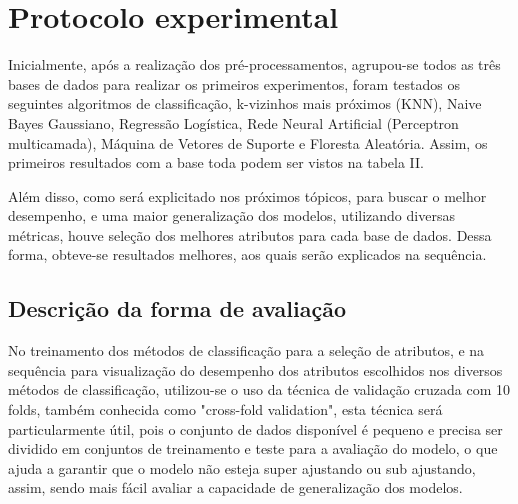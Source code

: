 \documentclass[10pt, conference, compsocconf]{IEEEtran}
\begin{document}
\section{Protocolo experimental}
Inicialmente, após a realização dos pré-processamentos, agrupou-se todos as três bases de dados para realizar os primeiros experimentos, foram testados os seguintes algoritmos de classificação, k-vizinhos mais próximos (KNN), Naive Bayes Gaussiano, Regressão Logística, Rede Neural Artificial (Perceptron multicamada), Máquina de Vetores de Suporte e Floresta Aleatória. Assim, os primeiros resultados com a base toda podem ser vistos na tabela II.

Além disso, como será explicitado nos próximos tópicos, para buscar o melhor desempenho, e uma maior generalização dos modelos, utilizando diversas métricas, houve seleção dos melhores atributos para cada base de dados. Dessa forma, obteve-se resultados melhores, aos quais serão explicados na sequência. 

\begin{table}[]
\caption{Métricas dos algoritmos com a base completa}
\centering
{}
\end{table}

\subsection{Descrição da forma de avaliação}
No treinamento dos métodos de classificação para a seleção de atributos, e na sequência para visualização do desempenho dos atributos escolhidos nos diversos métodos de classificação, utilizou-se o uso da técnica de validação cruzada com 10 folds, também conhecida como "cross-fold validation", esta técnica será particularmente útil, pois o conjunto de dados disponível é pequeno e precisa ser dividido em conjuntos de treinamento e teste para a avaliação do modelo, o que ajuda a garantir que o modelo não esteja super ajustando ou sub ajustando, assim, sendo mais fácil avaliar a capacidade de generalização dos modelos.
\end{document}
